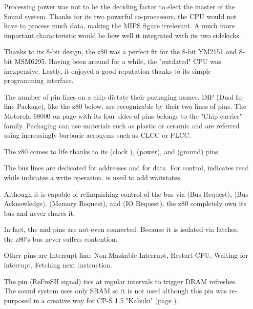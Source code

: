 Processing power was not to be the deciding factor to elect the master of the Sound system. Thanks for its two powerful co-processors, the CPU would not have to process much data, making the MIPS figure irrelevant. A much more important characteristic would be how well it integrated with its two sidekicks.

Thanks to its 8-bit design, the z80 was a perfect fit for the 8-bit YM2151 and 8-bit MSM6295. Having been around for a while, the "outdated" CPU was inexpensive. Lastly, it enjoyed a good reputation thanks to its simple programming interface.

\begin{trivia}
The number of pin lines on a chip dictate their packaging names. DIP (Dual In-line Package), like the z80 below, are recognizable by their two lines of pins. The Motorola 68000 on page \pageref{68000drawing} with its four sides of pins belongs to the "Chip carrier" family. Packaging can use materials such as plastic or ceramic and are referred using increasingly barbaric acronyms such as CLCC or PLCC.
\end{trivia}


The z80 comes to life thanks to its  (clock ),  (power), and  (ground) pins.

The bus lines are dedicated  for addresses and  for data. For control,  indicates read while  indicates a write operation.  is used to add waitstates. 

Although it is capable of relinquishing control of the bus via  (Bus Request),  (Bus Acknowledge),  (Memory Request), and  (IO Request), the z80 completely own its bus and never shares it. 

In fact, the  and  pins are not even connected.  Because it is isolated via latches, the z80's bus never suffers contention.


Other pins are  Interrupt line,  Non Maskable Interrupt,  Restart CPU,  Waiting for interrupt,  Fetching next instruction.

\label{z80_pinRFSH}
The  pin (ReFreSH signal) tics at regular intervals to trigger DRAM refreshes. The sound system uses only SRAM so it is not used although this pin was re-purposed in a creative way for CP-S 1.5 "Kabuki" (page \pageref{kabuki}).

